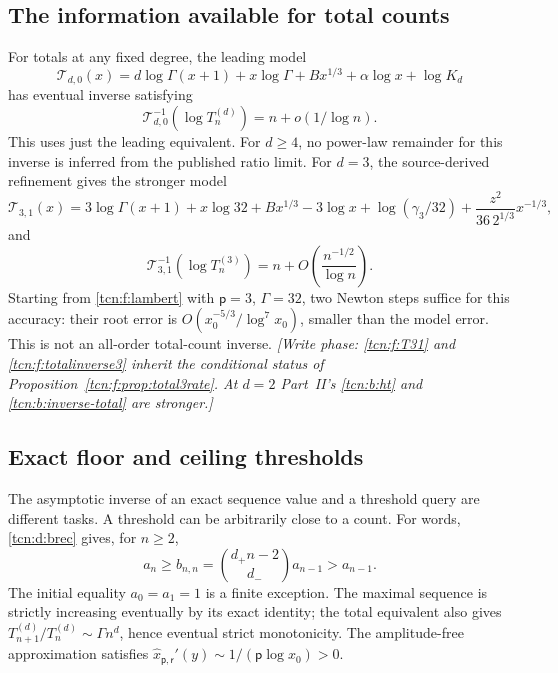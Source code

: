 \documentclass[11pt,letterpaper]{article}
\theoremstyle{remark}
\begin{document}
\subsection{The information available for total counts}
For totals at any fixed degree, the leading model
\begin{equation}\label{tcn:f:T0}
 \mathcal T_{d,0}(x)=d\log\Gamma(x+1)+x\log\Gamma+Bx^{1/3}
                        +\alpha\log x+\log K_d
\end{equation}
has eventual inverse satisfying
\[
 \mathcal T_{d,0}^{-1}(\log T^{(d)}_n)=n+o(1/\log n).
\]
This uses just the leading equivalent. For $d\ge4$, no power-law remainder for this inverse is inferred from the published ratio limit. For $d=3$, the source-derived refinement gives the stronger model
\begin{equation}\label{tcn:f:T31}
 \mathcal T_{3,1}(x)=3\log\Gamma(x+1)+x\log32
 +Bx^{1/3}-3\log x+\log(\gamma_3/32)
 +\frac{z^2}{36\,2^{1/3}}x^{-1/3},
\end{equation}
and
\begin{equation}\label{tcn:f:totalinverse3}
 \mathcal T_{3,1}^{-1}(\log T^{(3)}_n)
 =n+O\left(\frac{n^{-1/2}}{\log n}\right).
\end{equation}
Starting from \eqref{tcn:f:lambert} with $\mathsf p=3$, $\Gamma=32$, two Newton steps suffice for this accuracy: their root error is $O(x_0^{-5/3}/\log^7x_0)$, smaller than the model error. This is not an all-order total-count inverse. \emph{[Write phase: \eqref{tcn:f:T31} and \eqref{tcn:f:totalinverse3} inherit the conditional status of Proposition~\ref{tcn:f:prop:total3rate}. At $d=2$ Part~II's \eqref{tcn:b:ht} and \eqref{tcn:b:inverse-total} are stronger.]}

\subsection{Exact floor and ceiling thresholds}
The asymptotic inverse of an exact sequence value and a threshold query are different tasks. A threshold can be arbitrarily close to a count. For words, \eqref{tcn:d:brec} gives, for $n\ge2$,
\[
 a_n\ge b_{n,n}=\binom{d_+n-2}{d_-}a_{n-1}>a_{n-1}.
\]
The initial equality $a_0=a_1=1$ is a finite exception. The maximal sequence is strictly increasing eventually by its exact identity; the total equivalent also gives $T^{(d)}_{n+1}/T^{(d)}_n\sim\Gamma n^d$, hence eventual strict monotonicity. The amplitude-free approximation satisfies $\hat x_{\mathsf p,\mathsf r}'(y)\sim1/(\mathsf p\log x_0)>0$.
\end{document}
